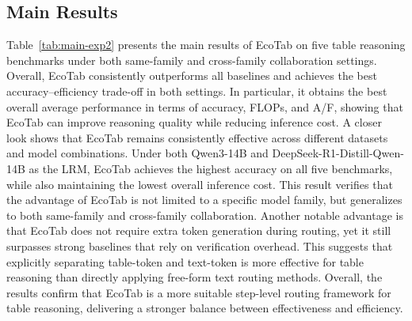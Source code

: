 \documentclass[11pt]{article}
\begin{document}
\subsection{Main Results}
\label{sec5.2}
Table~\ref{tab:main-exp2} presents the main results of EcoTab on five table reasoning benchmarks under both same-family and cross-family collaboration settings. Overall, EcoTab consistently outperforms all baselines and achieves the best accuracy--efficiency trade-off in both settings. In particular, it obtains the best overall average performance in terms of accuracy, FLOPs, and A/F, showing that EcoTab can improve reasoning quality while reducing inference cost. A closer look shows that EcoTab remains consistently effective across different datasets and model combinations. Under both Qwen3-14B and DeepSeek-R1-Distill-Qwen-14B as the LRM, EcoTab achieves the highest accuracy on all five benchmarks, while also maintaining the lowest overall inference cost. This result verifies that the advantage of EcoTab is not limited to a specific model family, but generalizes to both same-family and cross-family collaboration. Another notable advantage is that EcoTab does not require extra token generation during routing, yet it still surpasses strong baselines that rely on verification overhead. This suggests that explicitly separating table-token and text-token is more effective for table reasoning than directly applying free-form text routing methods. Overall, the results confirm that EcoTab is a more suitable step-level routing framework for table reasoning, delivering a stronger balance between effectiveness and efficiency.


\end{document}
